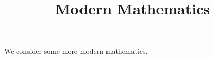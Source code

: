 \documentclass{ximera}
\title{Modern Mathematics}
\begin{document}
\begin{abstract}
\end{abstract}
\maketitle

We consider some more modern mathematics.
\end{document}
